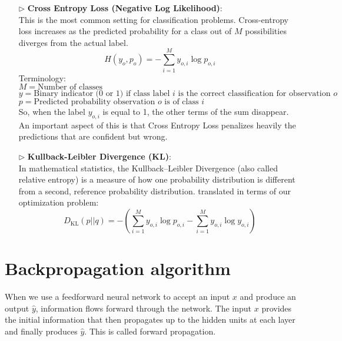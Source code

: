 \begin{itemize}
    \item[$\triangleright$] \textbf{Cross Entropy Loss (Negative Log Likelihood)}:\\
    This is the most common setting for classification problems. Cross-entropy loss increases as the predicted probability for a class out of $M$ possibilities diverges from the actual label.
    \begin{equation}
        H(y_o,p_o) = - \sum_{i=1}^{M} y_{o,i} \log{p_{o,i}}
    \end{equation}
    Terminology:\\
    $M = \text{Number of classes}$\\
    $y = \text{Binary indicator (0 or 1) if class label $i$ is the correct classification for observation $o$}$\\
    $p = \text{Predicted probability observation $o$ is of class $i$}$\\
    So, when the label $y_{o,i}$ is equal to 1, the other terms of the sum disappear. An important aspect of this is that Cross Entropy Loss penalizes heavily the predictions that are confident but wrong.
    
    \item[$\triangleright$] \textbf{Kullback-Leibler Divergence (KL)}:\\
    In mathematical statistics, the Kullback–Leibler Divergence (also called relative entropy) is a measure of how one probability distribution is different from a second, reference probability distribution. translated in terms of our optimization problem:
    \begin{equation}
        D_{\mathrm{KL}}(p||q) = - \left( \sum_{i=1}^{M} y_{o,i} \log{p_{o,i}} - \sum_{i=1}^{M} y_{o,i} \log{y_{o,i}} \right)
    \end{equation}
\end{itemize}





\section{Backpropagation algorithm}
When we use a feedforward neural network to accept an input $x$ and produce an output $\hat{y}$, information flows forward through the network. The input $x$ provides the initial information that then propagates up to the hidden units at each layer and finally produces $\hat{y}$. This is called forward propagation. 


